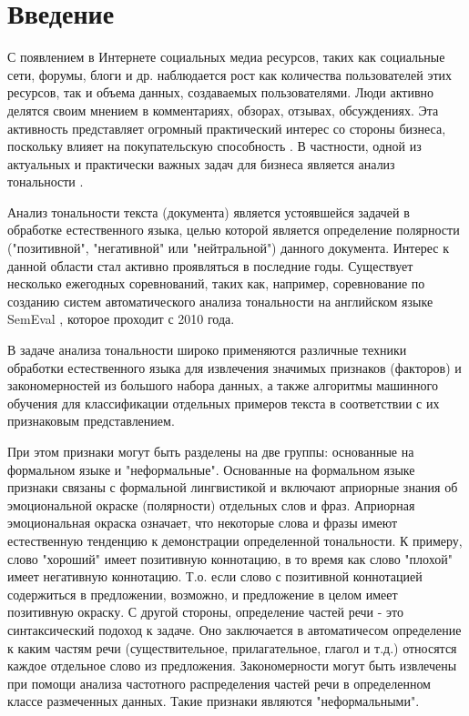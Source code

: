 \chapter*{Введение}							%

С появлением в Интернете социальных медиа ресурсов, таких как социальные сети, форумы, блоги и др. наблюдается рост как количества пользователей этих ресурсов, так и объема данных, создаваемых пользователями. Люди активно делятся своим мнением в комментариях, обзорах, отзывах, обсуждениях. Эта активность представляет огромный практический интерес со стороны бизнеса, поскольку влияет на покупательскую способность \cite{wang}. В частности, одной из актуальных и практически важных задач для бизнеса является анализ тональности \cite{mokoron2012}. 

Анализ тональности текста (документа) является устоявшейся задачей в обработке естественного языка, целью которой является определение полярности ("позитивной", "негативной" или "нейтральной") данного документа. Интерес к данной области стал активно проявляться в последние годы. Существует несколько ежегодных соревнований, таких как, например, соревнование по созданию систем автоматического анализа тональности на английском языке SemEval \cite{semeval2010}, которое проходит с 2010 года.

В задаче анализа тональности широко применяются различные техники обработки естественного языка для извлечения значимых признаков (факторов) и закономерностей из большого набора данных, а также алгоритмы машинного обучения для классификации отдельных примеров текста в соответствии с их признаковым представлением.

При этом признаки могут быть разделены на две группы: основанные на формальном языке и "неформальные". Основанные на формальном языке признаки связаны с формальной лингвистикой и включают априорные знания об эмоциональной окраске (полярности) отдельных слов и фраз. Априорная эмоциональная окраска означает, что некоторые слова и фразы имеют естественную тенденцию к демонстрации определенной тональности. К примеру, слово "хороший" имеет позитивную коннотацию, в то время как слово "плохой" имеет негативную коннотацию. Т.о. если слово с позитивной коннотацией содержиться в предложении, возможно, и предложение в целом имеет позитивную окраску. С другой стороны, определение частей речи - это синтаксический подоход к задаче. Оно заключается в автоматичесом определение к каким частям речи (существительное, прилагательное, глагол и т.д.) относятся каждое отдельное слово из предложения. Закономерности могут быть извлечены при помощи анализа частотного распределения частей речи в определенном классе размеченных данных. Такие признаки являются "неформальными".

